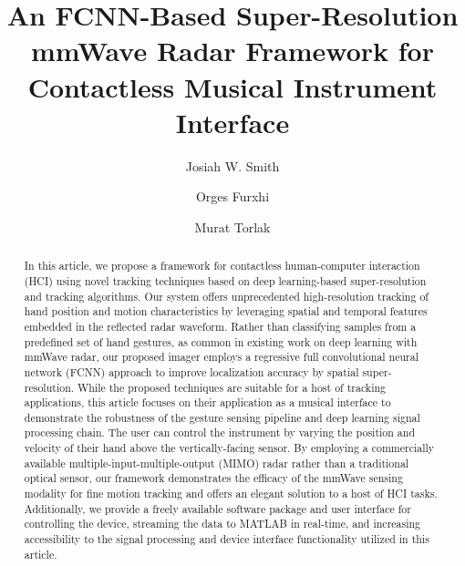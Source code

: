 \documentclass[10pt,journal,final]{IEEEtran}
\begin{document}
\title{An FCNN-Based Super-Resolution mmWave Radar Framework for Contactless Musical Instrument Interface}

\author[1]{Josiah W. Smith}
\author[2]{Orges Furxhi}
\author[1]{Murat Torlak}

\maketitle

\begin{abstract}
In this article, we propose a framework for contactless human-computer interaction (HCI) using novel tracking techniques based on deep learning-based super-resolution and tracking algorithms. 
Our system offers unprecedented high-resolution tracking of hand position and motion characteristics by leveraging spatial and temporal features embedded in the reflected radar waveform. 
Rather than classifying samples from a predefined set of hand gestures, as common in existing work on deep learning with mmWave radar, our proposed imager employs a regressive full convolutional neural network (FCNN) approach to improve localization accuracy by spatial super-resolution. 
While the proposed techniques are suitable for a host of tracking applications, this article focuses on their application as a musical interface to demonstrate the robustness of the gesture sensing pipeline and deep learning signal processing chain. 
The user can control the instrument by varying the position and velocity of their hand above the vertically-facing sensor.
By employing a commercially available multiple-input-multiple-output (MIMO) radar rather than a traditional optical sensor, our framework demonstrates the efficacy of the mmWave sensing modality for fine motion tracking and offers an elegant solution to a host of HCI tasks.
Additionally, we provide a freely available software package and user interface for controlling the device, streaming the data to MATLAB in real-time, and increasing accessibility to the signal processing and device interface functionality utilized in this article. 
\end {abstract}
\end{document}
